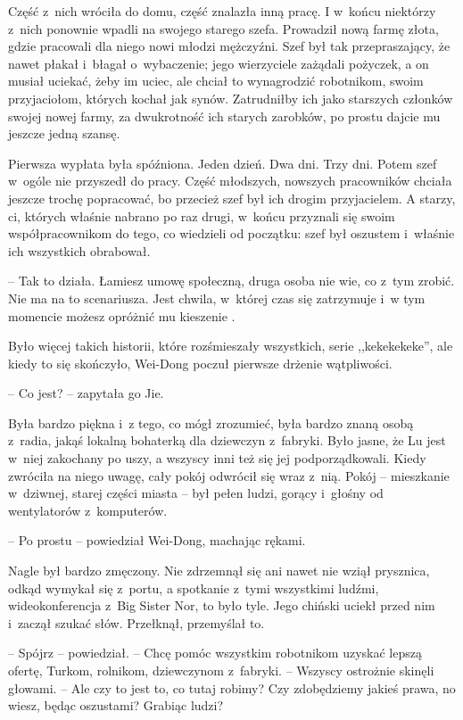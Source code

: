 \documentclass[oneside,polish,11pt,rmheadings]{mwbk}
\begin{document}
Część z~nich wróciła do domu, część znalazła inną pracę. I w~końcu niektórzy z~nich ponownie wpadli na swojego starego szefa. Prowadził nową farmę złota, gdzie pracowali dla niego nowi młodzi mężczyźni. Szef był tak przepraszający, że nawet płakał i~błagał o~wybaczenie; jego wierzyciele zażądali pożyczek, a on musiał uciekać, żeby im uciec, ale chciał to wynagrodzić robotnikom, swoim przyjaciołom, których kochał jak synów. Zatrudniłby ich jako starszych członków swojej nowej farmy, za dwukrotność ich starych zarobków, po prostu dajcie mu jeszcze jedną szansę.

Pierwsza wypłata była spóźniona. Jeden dzień. Dwa dni. Trzy dni. Potem szef w~ogóle nie przyszedł do pracy. Część młodszych, nowszych pracowników chciała jeszcze trochę popracować, bo przecież szef był ich drogim przyjacielem. A starzy, ci, których właśnie nabrano po raz drugi, w~końcu przyznali się swoim współpracownikom do tego, co wiedzieli od początku: szef był oszustem i~właśnie ich wszystkich obrabował.

-- Tak to działa. Łamiesz umowę społeczną, druga osoba nie wie, co z~tym zrobić. Nie ma na to scenariusza. Jest chwila, w~której czas się zatrzymuje i~w tym momencie możesz opróżnić mu kieszenie .

Było więcej takich historii, które rozśmieszały wszystkich, serie ,,kekekekeke'', ale kiedy to się skończyło, Wei-Dong poczuł pierwsze drżenie wątpliwości.

-- Co jest? -- zapytała go Jie. 

Była bardzo piękna i~z tego, co mógł zrozumieć, była bardzo znaną osobą z~radia, jakąś lokalną bohaterką dla dziewczyn z~fabryki. Było jasne, że Lu jest w~niej zakochany po uszy, a wszyscy inni też się jej podporządkowali. Kiedy zwróciła na niego uwagę, cały pokój odwrócił się wraz z~nią. Pokój -- mieszkanie w~dziwnej, starej części miasta -- był pełen ludzi, gorący i~głośny od wentylatorów z~komputerów.

-- Po prostu -- powiedział Wei-Dong, machając rękami. 

Nagle był bardzo zmęczony. Nie zdrzemnął się ani nawet nie wziął prysznica, odkąd wymykał się z~portu, a spotkanie z~tymi wszystkimi ludźmi, wideokonferencja z~Big Sister Nor, to było tyle. Jego chiński uciekł przed nim i~zaczął szukać słów. Przełknął, przemyślał to. 

-- Spójrz -- powiedział. -- Chcę pomóc wszystkim robotnikom uzyskać lepszą ofertę, Turkom, rolnikom, dziewczynom z~fabryki. -- Wszyscy ostrożnie skinęli głowami. -- Ale czy to jest to, co tutaj robimy? Czy zdobędziemy jakieś prawa, no wiesz, będąc oszustami? Grabiąc ludzi?
\end{document}
